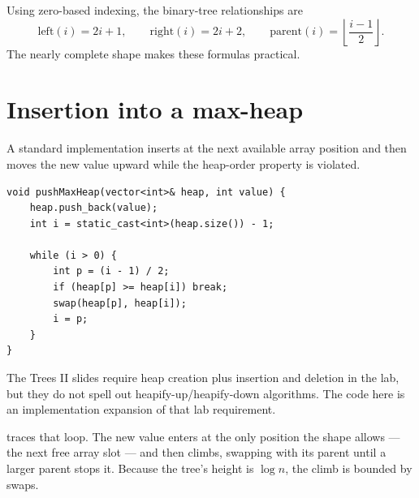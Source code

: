 Using zero-based indexing, the binary-tree relationships are
\[
\text{left}(i)=2i+1,\qquad \text{right}(i)=2i+2,\qquad \text{parent}(i)=\left\lfloor\frac{i-1}{2}\right\rfloor.
\]
The nearly complete shape makes these formulas practical.

\section{Insertion into a max-heap}

A standard implementation inserts at the next available array position and then moves the new value upward while the heap-order property is violated.

\begin{lstlisting}
void pushMaxHeap(vector<int>& heap, int value) {
    heap.push_back(value);
    int i = static_cast<int>(heap.size()) - 1;

    while (i > 0) {
        int p = (i - 1) / 2;
        if (heap[p] >= heap[i]) break;
        swap(heap[p], heap[i]);
        i = p;
    }
}
\end{lstlisting}

\begin{clarification}
The Trees II slides require heap creation plus insertion and deletion in the lab, but they do not spell out heapify-up/heapify-down algorithms. The code here is an implementation expansion of that lab requirement.
\end{clarification}

 traces that loop. The new value enters at the only position the
shape allows --- the next free array slot --- and then climbs, swapping with its parent until
a larger parent stops it. Because the tree's height is $\log n$, the climb is bounded by
 swaps.

